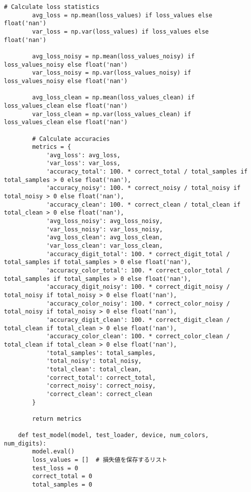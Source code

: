 \begin{lstlisting}[style=pythonstyle, caption={メインコード}]
        # Calculate loss statistics
        avg_loss = np.mean(loss_values) if loss_values else float('nan')
        var_loss = np.var(loss_values) if loss_values else float('nan')
    
        avg_loss_noisy = np.mean(loss_values_noisy) if loss_values_noisy else float('nan')
        var_loss_noisy = np.var(loss_values_noisy) if loss_values_noisy else float('nan')
    
        avg_loss_clean = np.mean(loss_values_clean) if loss_values_clean else float('nan')
        var_loss_clean = np.var(loss_values_clean) if loss_values_clean else float('nan')
    
        # Calculate accuracies
        metrics = {
            'avg_loss': avg_loss,
            'var_loss': var_loss,
            'accuracy_total': 100. * correct_total / total_samples if total_samples > 0 else float('nan'),
            'accuracy_noisy': 100. * correct_noisy / total_noisy if total_noisy > 0 else float('nan'),
            'accuracy_clean': 100. * correct_clean / total_clean if total_clean > 0 else float('nan'),
            'avg_loss_noisy': avg_loss_noisy,
            'var_loss_noisy': var_loss_noisy,
            'avg_loss_clean': avg_loss_clean,
            'var_loss_clean': var_loss_clean,
            'accuracy_digit_total': 100. * correct_digit_total / total_samples if total_samples > 0 else float('nan'),
            'accuracy_color_total': 100. * correct_color_total / total_samples if total_samples > 0 else float('nan'),
            'accuracy_digit_noisy': 100. * correct_digit_noisy / total_noisy if total_noisy > 0 else float('nan'),
            'accuracy_color_noisy': 100. * correct_color_noisy / total_noisy if total_noisy > 0 else float('nan'),
            'accuracy_digit_clean': 100. * correct_digit_clean / total_clean if total_clean > 0 else float('nan'),
            'accuracy_color_clean': 100. * correct_color_clean / total_clean if total_clean > 0 else float('nan'),
            'total_samples': total_samples,
            'total_noisy': total_noisy,
            'total_clean': total_clean,
            'correct_total': correct_total,
            'correct_noisy': correct_noisy,
            'correct_clean': correct_clean
        }
    
        return metrics
    
    def test_model(model, test_loader, device, num_colors, num_digits):
        model.eval()
        loss_values = []  # 損失値を保存するリスト
        test_loss = 0
        correct_total = 0
        total_samples = 0
    

\end{lstlisting}
